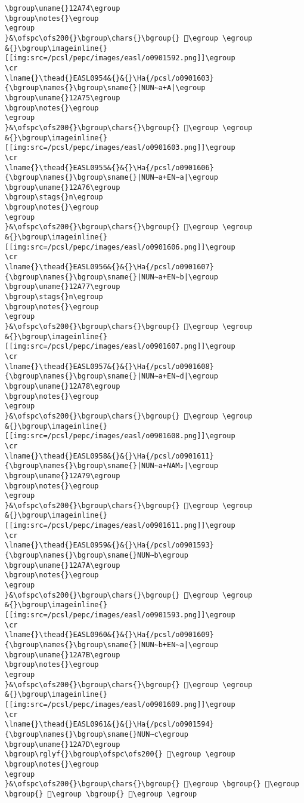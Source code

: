\begin{verbatim}
\bgroup\uname{}12A74\egroup
\bgroup\notes{}\egroup
\egroup
}&\ofspc\ofs200{}\bgroup\chars{}\bgroup{} 𒩴\egroup \egroup
&{}\bgroup\imageinline{}[[img:src=/pcsl/pepc/images/easl/o0901592.png]]\egroup
\cr
\lname{}\thead{}EASL0954&{}&{}\Ha{/pcsl/o0901603}{\bgroup\names{}\bgroup\sname{}|NUN∼a+A|\egroup
\bgroup\uname{}12A75\egroup
\bgroup\notes{}\egroup
\egroup
}&\ofspc\ofs200{}\bgroup\chars{}\bgroup{} 𒩵\egroup \egroup
&{}\bgroup\imageinline{}[[img:src=/pcsl/pepc/images/easl/o0901603.png]]\egroup
\cr
\lname{}\thead{}EASL0955&{}&{}\Ha{/pcsl/o0901606}{\bgroup\names{}\bgroup\sname{}|NUN∼a+EN∼a|\egroup
\bgroup\uname{}12A76\egroup
\bgroup\stags{}n\egroup
\bgroup\notes{}\egroup
\egroup
}&\ofspc\ofs200{}\bgroup\chars{}\bgroup{} 𒩶\egroup \egroup
&{}\bgroup\imageinline{}[[img:src=/pcsl/pepc/images/easl/o0901606.png]]\egroup
\cr
\lname{}\thead{}EASL0956&{}&{}\Ha{/pcsl/o0901607}{\bgroup\names{}\bgroup\sname{}|NUN∼a+EN∼b|\egroup
\bgroup\uname{}12A77\egroup
\bgroup\stags{}n\egroup
\bgroup\notes{}\egroup
\egroup
}&\ofspc\ofs200{}\bgroup\chars{}\bgroup{} 𒩷\egroup \egroup
&{}\bgroup\imageinline{}[[img:src=/pcsl/pepc/images/easl/o0901607.png]]\egroup
\cr
\lname{}\thead{}EASL0957&{}&{}\Ha{/pcsl/o0901608}{\bgroup\names{}\bgroup\sname{}|NUN∼a+EN∼d|\egroup
\bgroup\uname{}12A78\egroup
\bgroup\notes{}\egroup
\egroup
}&\ofspc\ofs200{}\bgroup\chars{}\bgroup{} 𒩸\egroup \egroup
&{}\bgroup\imageinline{}[[img:src=/pcsl/pepc/images/easl/o0901608.png]]\egroup
\cr
\lname{}\thead{}EASL0958&{}&{}\Ha{/pcsl/o0901611}{\bgroup\names{}\bgroup\sname{}|NUN∼a+NAM₂|\egroup
\bgroup\uname{}12A79\egroup
\bgroup\notes{}\egroup
\egroup
}&\ofspc\ofs200{}\bgroup\chars{}\bgroup{} 𒩹\egroup \egroup
&{}\bgroup\imageinline{}[[img:src=/pcsl/pepc/images/easl/o0901611.png]]\egroup
\cr
\lname{}\thead{}EASL0959&{}&{}\Ha{/pcsl/o0901593}{\bgroup\names{}\bgroup\sname{}NUN∼b\egroup
\bgroup\uname{}12A7A\egroup
\bgroup\notes{}\egroup
\egroup
}&\ofspc\ofs200{}\bgroup\chars{}\bgroup{} 𒩺\egroup \egroup
&{}\bgroup\imageinline{}[[img:src=/pcsl/pepc/images/easl/o0901593.png]]\egroup
\cr
\lname{}\thead{}EASL0960&{}&{}\Ha{/pcsl/o0901609}{\bgroup\names{}\bgroup\sname{}|NUN∼b+EN∼a|\egroup
\bgroup\uname{}12A7B\egroup
\bgroup\notes{}\egroup
\egroup
}&\ofspc\ofs200{}\bgroup\chars{}\bgroup{} 𒩻\egroup \egroup
&{}\bgroup\imageinline{}[[img:src=/pcsl/pepc/images/easl/o0901609.png]]\egroup
\cr
\lname{}\thead{}EASL0961&{}&{}\Ha{/pcsl/o0901594}{\bgroup\names{}\bgroup\sname{}NUN∼c\egroup
\bgroup\uname{}12A7D\egroup
\bgroup\rglyf{}\bgroup\ofspc\ofs200{} 𒩽\egroup \egroup
\bgroup\notes{}\egroup
\egroup
}&\ofspc\ofs200{}\bgroup\chars{}\bgroup{} 𒩼\egroup \bgroup{} 𒩽\egroup \bgroup{} 𒩾\egroup \bgroup{} 𒩿\egroup \egroup

\end{verbatim}
